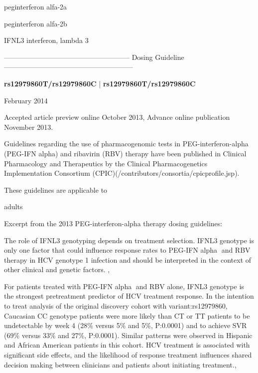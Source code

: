 \documentclass{resume} %
\begin{document}
\begin{rSection}{ peginterferon alfa-2a }
\end{rSection}\begin{rSection}{ peginterferon alfa-2b }
\item[]
\begin{rSubsection}{ IFNL3 }{ interferon, lambda 3 }{}{}
\item[]
\item[] ------------------------------------------------------ Dosing Guideline --------------------------------------------------------\newline
\item[]
\item[] \textbf{ rs12979860T/rs12979860C } | \textbf{ rs12979860T/rs12979860C }
\item February 2014
 \newline
\item Accepted article preview online October 2013,  Advance online publication November 2013.
 \newline
\item Guidelines regarding the use of pharmacogenomic tests in PEG-interferon-alpha (PEG-IFN alpha) and ribavirin (RBV) therapy have been published in Clinical Pharmacology and Therapeutics by the Clinical Pharmacogenetics Implementation Consortium (CPIC)(/contributors/consortia/cpicprofile.jsp).
 \newline
\item These guidelines are applicable to 
 \newline
\item adults
 \newline
\item Excerpt from the 2013 PEG-interferon-alpha therapy dosing guidelines:
 \newline
\item The role of IFNL3 genotyping depends on treatment selection. IFNL3 genotype is only one factor that could influence response rates to PEG-IFN alpha and RBV therapy in HCV genotype 1 infection and should be interpreted in the context of other clinical and genetic factors. , 
 \newline
\item For patients treated with PEG-IFN alpha and RBV alone, IFNL3 genotype is the strongest pretreatment predictor of HCV treatment response. In the intention to treat analysis of the original discovery cohort with variant:rs12979860, Caucasian CC genotype patients were more likely than CT or TT patients to be undetectable by week 4 (28\% versus 5\% and 5\%, P:0.0001) and to achieve SVR (69\% versus 33\% and 27\%, P:0.0001). Similar patterns were observed in Hispanic and African American patients in this cohort. HCV treatment is associated with significant side effects, and the likelihood of response treatment influences shared decision making between clinicians and patients about initiating treatment.,  

\end{rSubsection}
\end{rSection}
\end{document}
